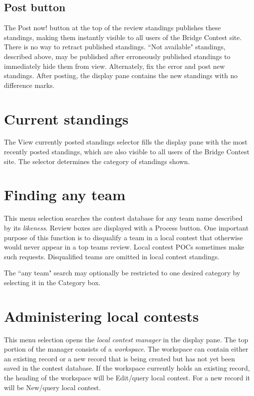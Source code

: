 \documentclass[11pt,letterpaper]{refart}
\def\ui#1{\textsf{#1}}
\begin{document}
\subsection{Post button}
The \ui{Post now!} button at the top of the review standings publishes these standings, making them
instantly visible to all users of the Bridge Contest site. There is no way to retract published standings.
``Not available" standings, described above, may be published after erroneously published standings
to immediately hide them from view. Alternately, fix the error and post new standings.
After posting, the display pane contains the new standings with no difference marks.

\section{Current standings}
The \ui{View currently posted standings} selector fills the display pane with the
most recently posted standings, which are also visible to all users of the Bridge Contest site. The
selector determines the category of standings shown.

\section{Finding any team}
This menu selection searches the contest database for any team name described 
by its \emph{likeness}. Review boxes are displayed with a \ui{Process} button. One
important purpose of this function is to disqualify a team in a local contest that otherwise 
would never appear in a top teams review. Local contest POCs sometimes make 
such requests. Disqualified teams are omitted in local contest standings. 

The ``any team" search may optionally be restricted to one desired category by selecting
it in the \ui{Category} box.

\section{Administering local contests}
This menu selection opens the \emph{local contest manager} in the display pane.
The top portion of the manager consists of a \emph{workspace}. The workspace
can contain either an existing record or a new record that is being created but has
not yet been saved in the contest database. If the workspace currently holds
an existing record, the heading of the workspace will be 
\ui{Edit/query local contest}. For a new record it will be \ui{New/query local contest}.
\end{document}
